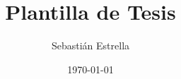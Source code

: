 \documentclass[12pt,oneside,a4paper]{book}
\begin{document}
\title{Plantilla de Tesis}
\author{Sebastián Estrella}
\date{\today}

\maketitle

\frontmatter






\tableofcontents

\mainmatter








\end{document}
